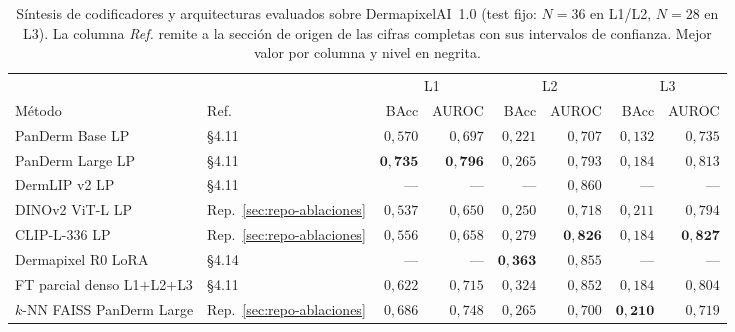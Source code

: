 \begin{table}[htbp]
\centering
\footnotesize
\setlength{\tabcolsep}{4pt}
\renewcommand{\arraystretch}{0.95}
\caption{Síntesis de codificadores y arquitecturas evaluados sobre
DermapixelAI~1.0 (test fijo: $N = 36$ en L1/L2, $N = 28$ en L3).
La columna \emph{Ref.} remite a la sección de origen de las cifras
completas con sus intervalos de confianza. Mejor valor por columna
y nivel en negrita.}
\label{tab:dermapixel-extra-sintesis}
\begin{tabular}{llrrrrrr}
\hline
                                  &     & \multicolumn{2}{c}{L1} & \multicolumn{2}{c}{L2} & \multicolumn{2}{c}{L3} \\
Método                            & Ref.& BAcc & AUROC           & BAcc & AUROC           & BAcc & AUROC \\
\hline
PanDerm Base LP                   & §4.11 & $0{,}570$          & $0{,}697$
                                          & $0{,}221$          & $0{,}707$
                                          & $0{,}132$          & $0{,}735$ \\
PanDerm Large LP                  & §4.11 & $\mathbf{0{,}735}$ & $\mathbf{0{,}796}$
                                          & $0{,}265$          & $0{,}793$
                                          & $0{,}184$          & $0{,}813$ \\
DermLIP v2 LP                     & §4.11 & ---                & ---
                                          & ---                & $0{,}860$
                                          & ---                & --- \\
DINOv2 ViT-L LP                   & Rep.~\ref{sec:repo-ablaciones} & $0{,}537$          & $0{,}650$
                                          & $0{,}250$          & $0{,}718$
                                          & $0{,}211$          & $0{,}794$ \\
CLIP-L-336 LP                     & Rep.~\ref{sec:repo-ablaciones} & $0{,}556$          & $0{,}658$
                                          & $0{,}279$          & $\mathbf{0{,}826}$
                                          & $0{,}184$          & $\mathbf{0{,}827}$ \\
Dermapixel R0 LoRA                & §4.14 & ---                & ---
                                          & $\mathbf{0{,}363}$ & $0{,}855$
                                          & ---                & --- \\
FT parcial denso L1$+$L2$+$L3      & §4.11 & $0{,}622$          & $0{,}715$
                                          & $0{,}324$          & $0{,}852$
                                          & $0{,}184$          & $0{,}804$ \\
$k$-NN FAISS PanDerm Large         & Rep.~\ref{sec:repo-ablaciones} & $0{,}686$          & $0{,}748$
                                          & $0{,}265$          & $0{,}700$
                                          & $\mathbf{0{,}210}$ & $0{,}719$ \\
\hline
\end{tabular}
\end{table}

